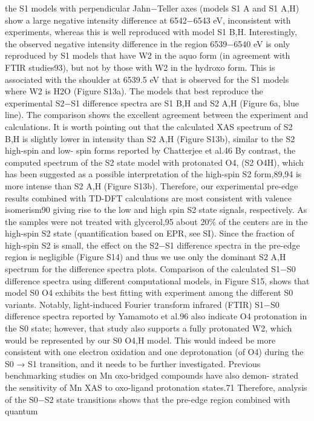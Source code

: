 \documentclass{article}
\begin{document}
the S1 models with perpendicular Jahn−Teller axes (models
S1
A and S1
A,H) show a large negative intensity difference at
6542−6543 eV, inconsistent with experiments, whereas this is
well reproduced with model S1
B,H. Interestingly, the observed
negative intensity difference in the region 6539−6540 eV is
only reproduced by S1 models that have W2 in the aquo form
(in agreement with FTIR studies93), but not by those with W2
in the hydroxo form. This is associated with the shoulder at
6539.5 eV that is observed for the S1 models where W2 is H2O
(Figure S13a).
The models that best reproduce the experimental S2−S1
difference spectra are S1
B,H and S2
A,H (Figure 6a, blue line).
The comparison shows the excellent agreement between the
experiment and calculations. It is worth pointing out that the
calculated XAS spectrum of S2
B,H is slightly lower in intensity
than S2
A,H (Figure S13b), similar to the S2 high-spin and low-
spin forms reported by Chatterjee et al.46 By contrast, the
computed spectrum of the S2 state model with protonated O4,
(S2
O4H), which has been suggested as a possible interpretation
of the high-spin S2 form,89,94 is more intense than S2
A,H (Figure
S13b). Therefore, our experimental pre-edge results combined
with TD-DFT calculations are most consistent with valence
isomerism90 giving rise to the low and high spin S2 state
signals, respectively. As the samples were not treated with
glycerol,95 about 20\% of the centers are in the high-spin S2
state (quantification based on EPR, see SI). Since the fraction
of high-spin S2 is small, the effect on the S2−S1 difference
spectra in the pre-edge region is negligible (Figure S14) and
thus we use only the dominant S2
A,H spectrum for the
difference spectra plots.
Comparison of the calculated S1−S0 difference spectra using
different computational models, in Figure S15, shows that
model S0
O4 exhibits the best fitting with experiment among the
different S0 variants. Notably, light-induced Fourier transform
infrared (FTIR) S1−S0 difference spectra reported by
Yamamoto et al.96 also indicate O4 protonation in the S0
state; however, that study also supports a fully protonated W2,
which would be represented by our S0
O4,H model. This would
indeed be more consistent with one electron oxidation and one
deprotonation (of O4) during the S0 → S1 transition, and it
needs to be further investigated. Previous benchmarking
studies on Mn oxo-bridged compounds have also demon-
strated the sensitivity of Mn XAS to oxo-ligand protonation
states.71 Therefore, analysis of the S0−S2 state transitions
shows that the pre-edge region combined with quantum
\end{document}
